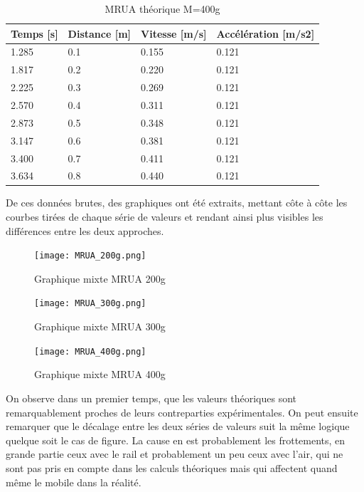 \begin{table}[ht]
    \centering
    \caption[MRUA théorique M=400g]{MRUA théorique M=400g}
    \begin{tabular}{|l|l|l|l|}
	\hline
	Temps [s]	&Distance [m]	&Vitesse [m/s]	&Accélération [m/s2]\\
	\hline
	1.285	&0.1	&0.155	&0.121\\
	1.817	&0.2	&0.220	&0.121\\
	2.225	&0.3	&0.269	&0.121\\
	2.570	&0.4	&0.311	&0.121\\
	2.873	&0.5	&0.348	&0.121\\
	3.147	&0.6	&0.381	&0.121\\
	3.400	&0.7	&0.411	&0.121\\
	3.634	&0.8	&0.440	&0.121\\
	\hline
    \end{tabular}
\end{table}

\newpage

De ces données brutes, des graphiques ont été extraits, mettant côte à côte les courbes tirées de chaque série de valeurs et rendant ainsi plus visibles les différences entre les deux approches.

\begin{figure}[h]
    \caption[Graphique mixte MRUA 200g]{Graphique mixte MRUA 200g}
    \centering
    \texttt{[image: MRUA\_200g.png]}
\end{figure}

\begin{figure}[h]
    \caption[Graphique mixte MRUA 300g]{Graphique mixte MRUA 300g}
    \centering
    \texttt{[image: MRUA\_300g.png]}
\end{figure}
\newpage

\begin{figure}[h]
    \caption[Graphique mixte MRUA 400g]{Graphique mixte MRUA 400g}
    \centering
    \texttt{[image: MRUA\_400g.png]}
\end{figure}

On observe dans un premier temps, que les valeurs théoriques sont remarquablement proches de leurs contreparties expérimentales. On peut ensuite remarquer que le décalage entre les deux séries de valeurs suit la même logique quelque soit le cas de figure. La cause en est probablement les frottements, en grande partie ceux avec le rail et probablement un peu ceux avec l'air, qui ne sont pas pris en compte dans les calculs théoriques mais qui affectent quand même le mobile dans la réalité.

